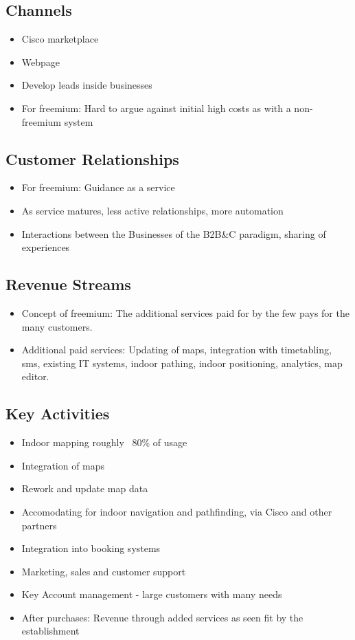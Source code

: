 \subsection{Channels}

\begin{itemize}
    \item Cisco marketplace
    \item Webpage
    \item Develop leads inside businesses
    \item For freemium: Hard to argue against initial high costs as with a non-freemium system
\end{itemize}

\subsection{Customer Relationships}
\begin{itemize}
    \item For freemium: Guidance as a service
    \item As service matures, less active relationships, more automation
    \item Interactions between the Businesses of the B2B\&C paradigm, sharing of experiences
\end{itemize}

\subsection{Revenue Streams}
\begin{itemize}
    \item Concept of freemium: The additional services paid for by the few pays for the many customers.
    \item Additional paid services: Updating of maps, integration with timetabling, sms, existing IT systems, indoor pathing, indoor positioning, analytics, map editor.
    
\end{itemize}

\subsection{Key Activities}
\begin{itemize}
    \item Indoor mapping roughly ~80\% of usage
    \item Integration of maps
    \item Rework and update map data
    \item Accomodating for indoor navigation and pathfinding, via Cisco and other partners
    \item Integration into booking systems
    \item Marketing, sales and customer support
    \item Key Account management - large customers with many needs
    \item After purchases: Revenue through added services as seen fit by the establishment
\end{itemize}

